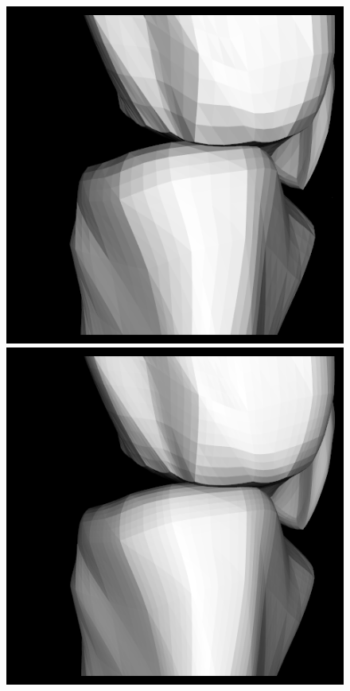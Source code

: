\documentclass[10pt, conference, compsocconf]{IEEEtran}
\begin{document}
\begin{figure}[htbp]
{\begin{minipage}[h]{0.16\linewidth}
        \includegraphics[width=\textwidth]{./Figure/footbones/end/weight22.png}\\
        \includegraphics[width=\textwidth]{./Figure/footbones/end/weight23.png}\vspace{1ex}\\

\end{minipage}}
\end{figure}
\end{document}
